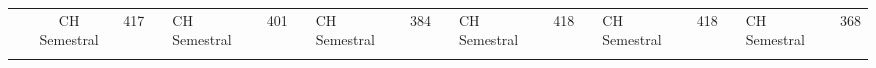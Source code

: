 \begin{landscape}
\begin{table}[h!]
\begin{tabular}{lcllcllcllcllcllcl}
                          & CH Semestral                                                                                                             & 417                          &                                                 & \multicolumn{1}{l}{CH Semestral}                                                                                                                    & 401                                                   &                         & \multicolumn{1}{l}{CH Semestral}                                                                                         & 384                           &                                                 & \multicolumn{1}{l}{CH Semestral}                                                                                                          & 418                                                   &                         & \multicolumn{1}{l}{CH Semestral}                                                                                                    & 418                           &                                                 & \multicolumn{1}{l}{CH Semestral}                                                                                                                      & 368                                                   \\
                          & \multicolumn{1}{l}{}                                                                                                     &                              &                                                 & \multicolumn{1}{l}{}                                                                                                                                &                                                       &                         & \multicolumn{1}{l}{}                                                                                                     &                               &                                                 & \multicolumn{1}{l}{}                                                                                                                      &                                                       &                         & \multicolumn{1}{l}{}                                                                                                                &                               &                                                 & \multicolumn{1}{l}{}                                                                                                                                  &                                                       \\ \cline{1-3} \cline{16-18} 

\end{tabular}
\end{table}
\end{landscape}
